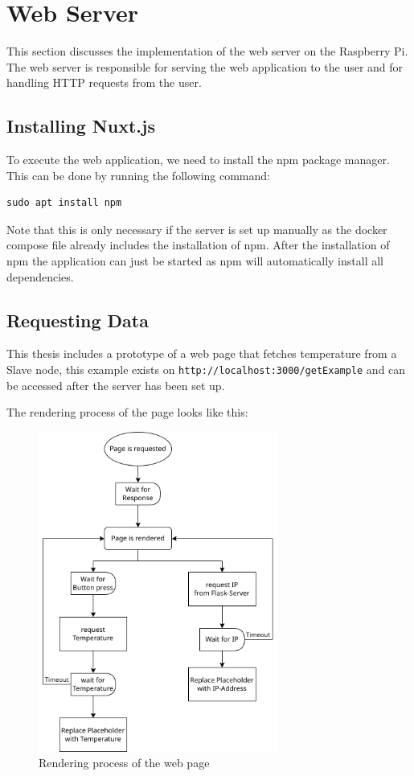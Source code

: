 \section{Web Server} \label{sec:webServer}
This section discusses the implementation of the web server
on the Raspberry Pi. The web server is responsible for
serving the web application to the user and for handling
HTTP requests from the user.
            
    \subsection{Installing Nuxt.js}
    To execute the web application, we need to install
    the npm package manager. This can be done by running
    the following command:
    \begin{verbatim}
sudo apt install npm
    \end{verbatim}
    Note that this is only necessary if the server is set up
    manually as the  docker compose file already includes the
    installation of npm. After the installation of npm the
    application can just be started as npm will automatically
    install all dependencies.

    \subsection{Requesting Data}
    This thesis includes a prototype of a web page that
    fetches temperature from a Slave node, this example exists
    on \texttt{http://localhost:3000/getExample} and can be accessed
    after the server has been set up. \npar

    The rendering process of the page looks like this:
    \begin{figure}[H]
        \centering
        \includegraphics[width=0.7\textwidth]{topics/flowcharts/PageRender.png}
        \caption{Rendering process of the web page}
        \label{fig:webServer}
    \end{figure}
